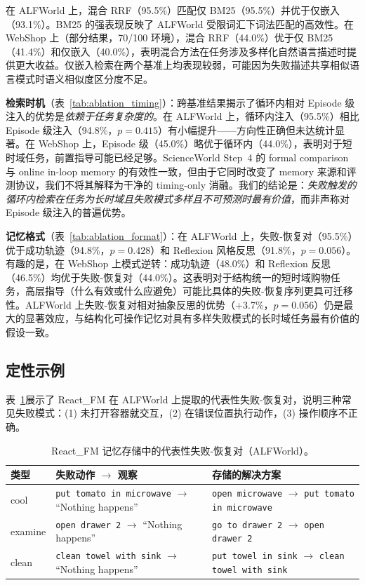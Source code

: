 \documentclass[11pt,a4paper]{article}
\newcommand{\method}{React\_FM}
\begin{document}
在 ALFWorld 上，混合 RRF（95.5\%）匹配仅 BM25（95.5\%）并优于仅嵌入（93.1\%）。BM25 的强表现反映了 ALFWorld 受限词汇下词法匹配的高效性。在 WebShop 上（部分结果，70/100 环境），混合 RRF（44.0\%）优于仅 BM25（41.4\%）和仅嵌入（40.0\%），表明混合方法在任务涉及多样化自然语言描述时提供更大收益。仅嵌入检索在两个基准上均表现较弱，可能因为失败描述共享相似语言模式时语义相似度区分度不足。

\textbf{检索时机}（表~\ref{tab:ablation_timing}）：跨基准结果揭示了循环内相对 Episode 级注入的优势是\emph{依赖于任务复杂度的}。在 ALFWorld 上，循环内注入（95.5\%）相比 Episode 级注入（94.8\%，$p{=}0.415$）有小幅提升——方向性正确但未达统计显著。在 WebShop 上，Episode 级（45.0\%）略优于循环内（44.0\%），表明对于短时域任务，前置指导可能已经足够。ScienceWorld Step~4 的 formal comparison 与 online in-loop memory 的有效性一致，但由于它同时改变了 memory 来源和评测协议，我们不将其解释为干净的 timing-only 消融。我们的结论是：\emph{失败触发的循环内检索在任务为长时域且失败模式多样且不可预测时最有价值}，而非声称对 Episode 级注入的普遍优势。

\textbf{记忆格式}（表~\ref{tab:ablation_format}）：在 ALFWorld 上，失败-恢复对（95.5\%）优于成功轨迹（94.8\%，$p{=}0.428$）和 Reflexion 风格反思（91.8\%，$p{=}0.056$）。有趣的是，在 WebShop 上模式逆转：成功轨迹（48.0\%）和 Reflexion 反思（46.5\%）均优于失败-恢复对（44.0\%）。这表明对于结构统一的短时域购物任务，高层指导（什么有效或什么应避免）可能比具体的失败-恢复序列更具可迁移性。ALFWorld 上失败-恢复对相对抽象反思的优势（+3.7\%，$p{=}0.056$）仍是最大的显著效应，与结构化可操作记忆对具有多样失败模式的长时域任务最有价值的假设一致。

\subsection{定性示例}

表~\ref{tab:examples}展示了 \method{} 在 ALFWorld 上提取的代表性失败-恢复对，说明三种常见失败模式：(1) 未打开容器就交互，(2) 在错误位置执行动作，(3) 操作顺序不正确。

\begin{table}[t]
\centering
\caption{\method{} 记忆存储中的代表性失败-恢复对（ALFWorld）。}
\label{tab:examples}
\small
\begin{tabular}{p{1.2cm}p{3.0cm}p{3.0cm}}
\toprule
类型 & 失败动作 $\to$ 观察 & 存储的解决方案 \\
\midrule
cool & \texttt{put tomato in microwave} $\to$ ``Nothing happens'' & \texttt{open microwave} $\to$ \texttt{put tomato in microwave} \\
\addlinespace
examine & \texttt{open drawer 2} $\to$ ``Nothing happens'' & \texttt{go to drawer 2} $\to$ \texttt{open drawer 2} \\
\addlinespace
clean & \texttt{clean towel with sink} $\to$ ``Nothing happens'' & \texttt{put towel in sink} $\to$ \texttt{clean towel with sink} \\
\bottomrule
\end{tabular}
\end{table}
\end{document}
